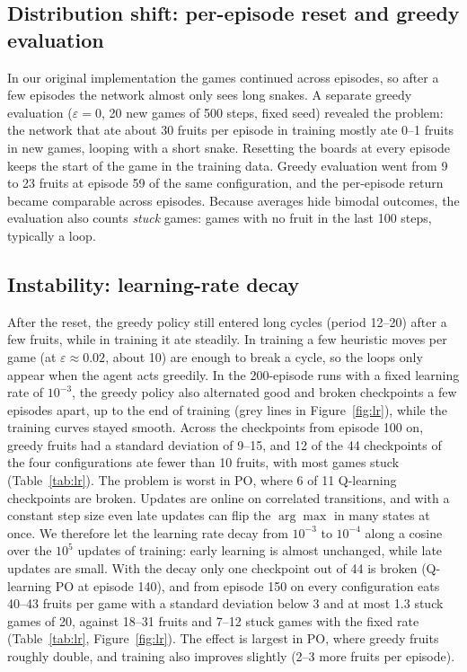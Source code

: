 \documentclass{article}
\begin{document}
\subsection{Distribution shift: per-episode reset and greedy evaluation}
\label{sec:reset}
In our original implementation the games continued across episodes, so after a few episodes the network almost only sees long snakes.
A separate greedy evaluation ($\varepsilon=0$, 20 new games of 500 steps, fixed seed) revealed the problem: the network that ate about 30 fruits per episode in training mostly ate 0--1 fruits in new games, looping with a short snake.
Resetting the boards at every episode keeps the start of the game in the training data. Greedy evaluation went from 9 to 23 fruits at episode 59 of the same configuration, and the per-episode return became comparable across episodes.
Because averages hide bimodal outcomes, the evaluation also counts \emph{stuck} games: games with no fruit in the last 100 steps, typically a loop.

\subsection{Instability: learning-rate decay}
\label{sec:lr}
After the reset, the greedy policy still entered long cycles (period 12--20) after a few fruits, while in training it ate steadily.
In training a few heuristic moves per game (at $\varepsilon\approx0.02$, about 10) are enough to break a cycle, so the loops only appear when the agent acts greedily.
In the 200-episode runs with a fixed learning rate of $10^{-3}$, the greedy policy also alternated good and broken checkpoints a few episodes apart, up to the end of training (grey lines in Figure~\ref{fig:lr}), while the training curves stayed smooth.
Across the checkpoints from episode 100 on, greedy fruits had a standard deviation of 9--15, and 12 of the 44 checkpoints of the four configurations ate fewer than 10 fruits, with most games stuck (Table~\ref{tab:lr}).
The problem is worst in PO, where 6 of 11 Q-learning checkpoints are broken.
Updates are online on correlated transitions, and with a constant step size even late updates can flip the $\arg\max$ in many states at once.
We therefore let the learning rate decay from $10^{-3}$ to $10^{-4}$ along a cosine over the $10^5$ updates of training: early learning is almost unchanged, while late updates are small.
With the decay only one checkpoint out of 44 is broken (Q-learning PO at episode 140), and from episode 150 on every configuration eats 40--43 fruits per game with a standard deviation below 3 and at most 1.3 stuck games of 20, against 18--31 fruits and 7--12 stuck games with the fixed rate (Table~\ref{tab:lr}, Figure~\ref{fig:lr}).
The effect is largest in PO, where greedy fruits roughly double, and training also improves slightly (2--3 more fruits per episode).
\end{document}

